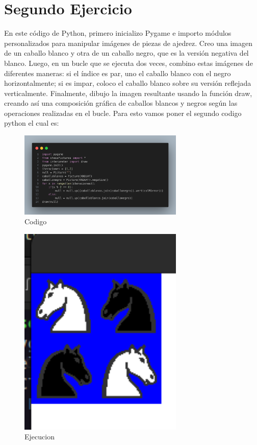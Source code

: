 \documentclass[10pt, a4paper]{article}
\begin{document}
\section{Segundo Ejercicio}
En este código de Python, primero inicializo Pygame e importo módulos personalizados para manipular imágenes de piezas de ajedrez. Creo una imagen de un caballo blanco y otra de un caballo negro, que es la versión negativa del blanco. Luego, en un bucle que se ejecuta dos veces, combino estas imágenes de diferentes maneras: si el índice es par, uno el caballo blanco con el negro horizontalmente; si es impar, coloco el caballo blanco sobre su versión reflejada verticalmente. Finalmente, dibujo la imagen resultante usando la función draw, creando así una composición gráfica de caballos blancos y negros según las operaciones realizadas en el bucle.
\singlespacing
Para esto vamos poner el segundo codigo python el cual es:  
\begin{figure}[H]
  \centering
  \includegraphics[width=0.7\textwidth]{img/Ej2.png}
  \caption{Codigo}
\end{figure}

\begin{figure}[H]
  \centering
  \includegraphics[width=0.7\textwidth]{img/Ejercicio2.png}
  \caption{Ejecucion}
\end{figure}
\end{document}
